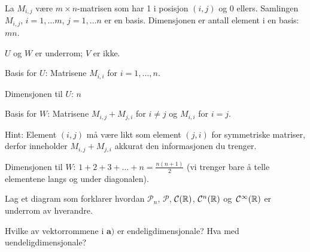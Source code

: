 \begin{losning}
\begin{punkt}
La $M_{i,j}$ være $m\times n$-matrisen som har 1 i posisjon $(i,j)$ og 0 ellers. Samlingen $M_{i,j}$, $i=1,\dots m$, $j=1,\dots n$ er en basis. Dimensjonen er antall element i en basis: $mn$.
\end{punkt}

\begin{punkt}
$U$ og $W$ er underrom; $V$ er ikke.
\end{punkt}

\begin{punkt}
\noindent
Basis for $U$: Matrisene $M_{i,i}$ for $i=1,\dots,n$.

\noindent
Dimensjonen til $U$: $n$

\noindent
Basis for $W$: Matrisene $M_{i,j}+M_{j,i}$ for $i\neq j$ og $M_{i,i}$ for $i=j$.

\noindent
Hint: Element $(i,j)$ må være likt som element $(j,i)$ for symmetriske matriser, derfor inneholder $M_{i,j}+M_{j,i}$ akkurat den informasjonen du trenger.


\noindent 
Dimensjonen til $W$: $1+2+3+\dots +n=\frac{n(n+1)}{2}$ (vi trenger bare å telle elementene langs og under diagonalen).
\end{punkt}


\end{losning}



\begin{oppgave}

\begin{punkt}
Lag et diagram som forklarer hvordan $\mathcal{P}_n$, $\mathcal{P}$, $\mathcal{C} (\mathbb{R})$, $\mathcal{C}^n(\mathbb{R})$ og~$\mathcal{C}^\infty(\mathbb{R})$ er underrom av hverandre.
\end{punkt}

\begin{punkt}
Hvilke av vektorrommene i $\textbf{a)}$ er endeligdimensjonale? Hva med uendeligdimensjonale?
\end{punkt}


\end{oppgave}

